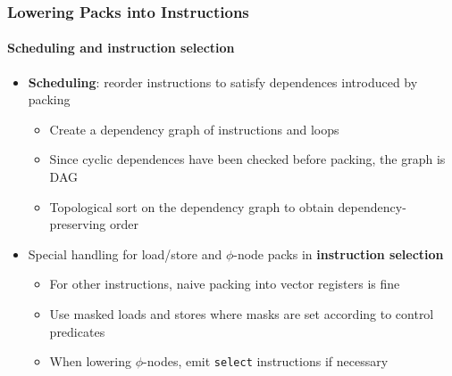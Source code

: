 \documentclass[aspectratio=169]{beamer}
\begin{document}
\begin{frame}
  \frametitle{Lowering Packs into Instructions}
  \framesubtitle{Scheduling and instruction selection}

  \begin{itemize}
    \item {\bfseries Scheduling}: reorder instructions to satisfy dependences introduced by packing
    \begin{itemize}
      \item Create a dependency graph of instructions and loops
      \item Since cyclic dependences have been checked before packing, the graph is DAG
      \item Topological sort on the dependency graph to obtain dependency-preserving order
    \end{itemize}
    \pause
    \item Special handling for load/store and \(\phi\)-node packs in {\bfseries instruction selection}
    \begin{itemize}
      \item For other instructions, naive packing into vector registers is fine
      \item Use masked loads and stores where masks are set according to control predicates
      \item When lowering \(\phi\)-nodes, emit \texttt{select} instructions if necessary
    \end{itemize}
  \end{itemize}
\end{frame}
\end{document}
